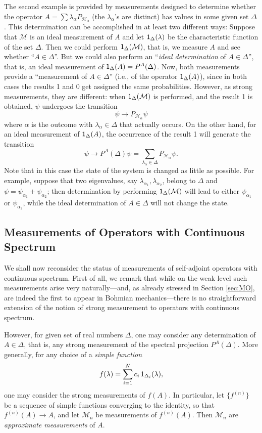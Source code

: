 \documentclass[12pt]{article}
\newcommand{\sa}{self-adjoint}
\newcommand{\BM}{Bohmian mechanics}
\renewcommand{\a}{\alpha}
\newcommand{\la}{\lambda_{\a}}
\newcommand{\Pa}{ P_{ {\mathcal{H}_{\a} } } }
\newcommand{\M}{\mbox{$\mathcal{M}$}}
\begin{document}
The second example is provided by measurements designed to determine
whether the operator $A=\sum \la\Pa$ (the $\la$'s are distinct) has
values in some given set $\Delta$.  This determination can be
accomplished in at least two different ways: Suppose that $\M$ is an
ideal measurement of $A$ and let ${\sf 1}_\Delta(\lambda)$ be the
characteristic function of the set $\Delta$.  Then we could perform
${\sf 1}_\Delta(\M)$, that is, we measure $A$ and see whether
``$A\in\Delta$''.  But we could also perform an ``\emph{ideal
   determination} of $A\in\Delta$'', that is, an ideal measurement of
${\sf 1}_\Delta(A) = P^A(\Delta)$.  Now, both measurements provide a
``measurement of $A\in\Delta $'' (i.e., of the operator $ {\sf
   1}_\Delta(A)$), since in both cases the results 1 and 0 get assigned
the same probabilities.  However, as strong measurements, they are
different: when ${\sf 1}_\Delta(\M)$ is performed, and the result 1 is
obtained, $\psi$ undergoes the transition
$$
\psi \to \Pa \psi
$$
where $\a$ is the outcome with $\la\in \Delta$ that actually
occurs.  On the other hand, for an ideal measurement of ${\sf
   1}_\Delta(A)$, the occurrence of the result 1 will generate the
transition
$$
\psi \to P^{A}(\Delta)\psi = \sum_{\la\in \Delta} \Pa\psi.
$$
Note that in this case the state of the system is changed as little
as possible. For example, suppose that two eigenvalues, say
$\lambda_{\alpha_1}, \lambda_{\alpha_2}$, belong to $\Delta$ and $\psi
= \psi_{\alpha_1} + \psi_{\alpha_2}$; then determination by performing
${\sf 1}_\Delta(\M)$ will lead to either $\psi_{\alpha_1}$ or $
\psi_{\alpha_2}$, while the ideal determination of $A\in\Delta$ will
not change the state.




\subsection{Measurements of Operators with Continuous Spectrum}
\label{subsec.mocs}
We shall now reconsider the status of measurements of \sa{} operators
with continuous spectrum.  First of all, we remark that while on the
weak level such measurements arise very naturally---and, as already
stressed in Section \ref{sec:MO}, are indeed the first to appear in
\BM---there is no straightforward extension of the notion of strong
measurement to operators with continuous spectrum.


However, for given set of real numbers $\Delta$, one may consider any
determination of $A \in \Delta$, that is, any strong measurement of
the spectral projection $P^{A}(\Delta)$.  More generally, for any
choice of a \emph{simple function}
%
\begin{displaymath}
f (\lambda) = \sum_{i=1}^{N} c_i\, {\sf 1}_{\Delta_i}(\lambda) ,
\end{displaymath}
%
one may consider the strong measurements of $f(A)$.  In particular,
let $\{ f^{(n)} \}$ be a sequence of simple functions converging to
the identity, so that $f^{(n)}(A) \rightarrow A$, and let $\M_n $ be
measurements of $f^{(n)}(A)$.  Then $\M_n $ are \emph{ approximate
   measurements} of $A$.
\end{document}
